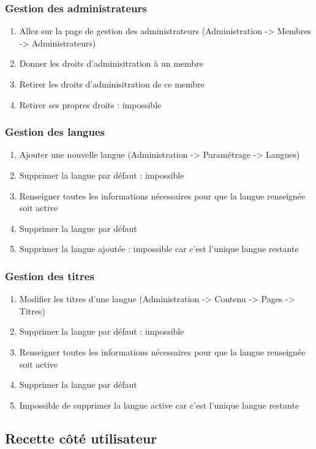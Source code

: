 \documentclass[11pt]{report}
\begin{document}
\subsubsection{Gestion des administrateurs}
\begin{enumerate}
 \item Allez sur la page de gestion des administrateurs (Administration -> Membres -> Administrateurs)
 \item Donner les droits d'adminisitration à un membre
 \item Retirer les droits d'adminisitration de ce membre
 \item Retirer ses propres droits : impossible
\end{enumerate}

\subsubsection{Gestion des langues}
\begin{enumerate}
 \item Ajouter une nouvelle langue (Administration -> Paramétrage -> Langues)
 \item Supprimer la langue par défaut : impossible
 \item Renseigner toutes les informations nécessaires pour que la langue renseignée soit active
 \item Supprimer la langue par défaut
 \item Supprimer la langue ajoutée : impossible car c'est l'unique langue restante
\end{enumerate}

\subsubsection{Gestion des titres}
\begin{enumerate}
 \item Modifier les titres d'une langue (Administration -> Contenu -> Pages -> Titres)
 \item Supprimer la langue par défaut : impossible
 \item Renseigner toutes les informations nécessaires pour que la langue renseignée soit active
 \item Supprimer la langue par défaut
 \item Impossible de supprimer la langue active car c'est l'unique langue restante
\end{enumerate}

\subsection{Recette côté utilisateur}
\end{document}
